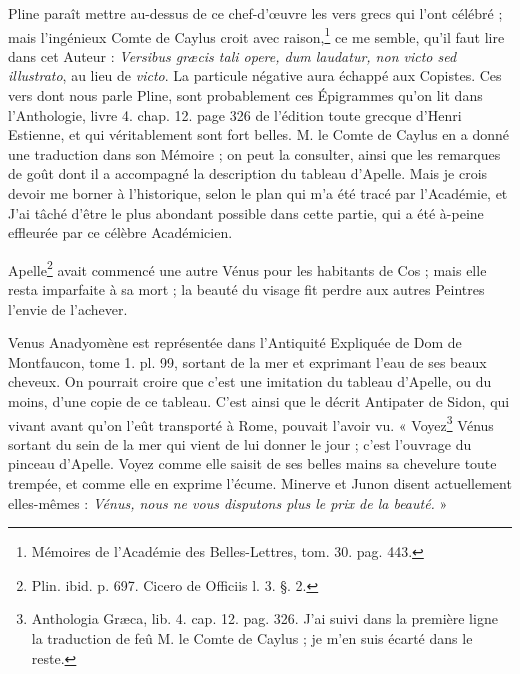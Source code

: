 \documentclass[a4paper, 18pt, oneside]{article}
\begin{document}
Pline paraît mettre au-dessus de ce chef-d'œuvre les vers grecs qui l'ont célébré ; mais l'ingénieux Comte de Caylus croit avec raison,\footnote{Mémoires de l'Académie des Belles-Lettres, tom. 30. pag. 443.} ce me semble, qu'il faut lire dans cet Auteur : \emph{Versibus græcis tali opere, dum laudatur, non victo sed illustrato}, au lieu de \emph{victo}. La particule négative aura échappé aux Copistes. Ces vers dont nous parle Pline, sont probablement ces Épigrammes qu'on lit dans l'Anthologie, livre 4. chap. 12. page 326 de l'édition toute grecque d'Henri Estienne, et qui véritablement sont fort belles. M. le Comte de Caylus en a donné une traduction dans son Mémoire ; on peut la consulter, ainsi que les remarques de goût dont il a accompagné la description du tableau d'Apelle. Mais je crois devoir me borner à l'historique, selon le plan qui m'a été tracé par l'Académie, et J'ai tâché d'être le plus abondant possible dans cette partie, qui a été à-peine effleurée par ce célèbre Académicien.

Apelle\footnote{Plin. ibid. p. 697. Cicero de Officiis l. 3. §. 2.} avait commencé une autre Vénus pour les habitants de Cos ; mais elle resta imparfaite à sa mort ; la beauté du visage fit perdre aux autres Peintres l'envie de l'achever.

Venus Anadyomène est représentée dans l'Antiquité Expliquée de Dom de Montfaucon, tome 1. pl. 99, sortant de la mer et exprimant l'eau de ses beaux cheveux. On pourrait croire que c'est une imitation du tableau d'Apelle, ou du moins, d'une copie de ce tableau. C'est ainsi que le décrit Antipater de Sidon, qui vivant avant qu'on l'eût transporté à Rome, pouvait l'avoir vu. « Voyez\footnote{Anthologia Græca, lib. 4. cap. 12. pag. 326. J'ai suivi dans la première ligne la traduction de feû M. le Comte de Caylus ; je m'en suis écarté dans le reste.} Vénus sortant du sein de la mer qui vient de lui donner le jour ; c'est l'ouvrage du pinceau d'Apelle. Voyez comme elle saisit de ses belles mains sa chevelure toute trempée, et comme elle en exprime l'écume. Minerve et Junon disent actuellement elles-mêmes : \emph{Vénus, nous ne vous disputons plus le prix de la beauté.} »
\end{document}
